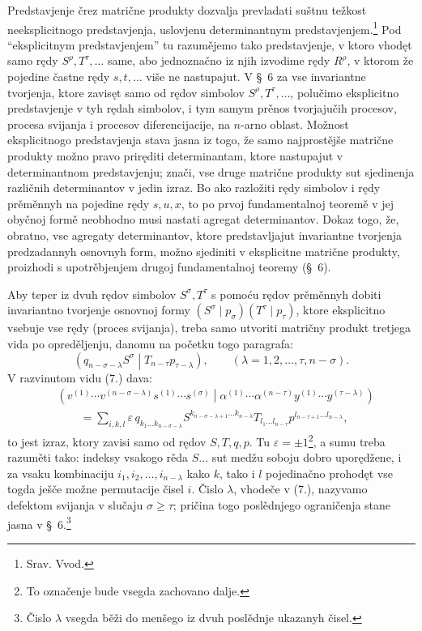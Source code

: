 \documentclass[11pt]{article}
\newcommand{\pair}[2]{\left(#1\middle|#2\right)}
\newcommand{\eps}{\varepsilon}
\begin{document}
Predstavjenje črez matrične produkty dozvalja prevladati suštnu težkost neeksplicitnogo predstavjenja, uslovjenu determinantnym predstavjenjem.\footnote{Srav. Vvod.} Pod ``eksplicitnym predstavjenjem'' tu razumějemo tako predstavjenje, v ktoro vhodęt samo rędy $S^\rho,T^\tau,\ldots$ same, abo jednoznačno iz njih izvodime rędy $R^\rho$, v ktorom že pojedine častne rędy $s,t,\ldots$ više ne nastupajut. V \S\ 6 za vse invariantne tvorjenja, ktore zavisęt samo od rędov simbolov $S^\rho,T^\tau,\ldots$, polučimo eksplicitno predstavjenje v tyh rędah simbolov, i tym samym prěnos tvorjajučih procesov, procesa svijanja i procesov diferencijacije, na $n$-arno oblast. Možnost eksplicitnogo predstavjenja stava jasna iz togo, že samo najprostějše matrične produkty možno pravo priręditi determinantam, ktore nastupajut v determinantnom predstavjenju; znači, vse druge matrične produkty sut sjedinenja različnih determinantov v jedin izraz. Bo ako razložiti rędy simbolov i rędy prěměnnyh na pojedine rędy $s,u,x$, to po prvoj fundamentalnoj teoremě v jej obyčnoj formě neobhodno musi nastati agregat determinantov. Dokaz togo, že, obratno, vse agregaty determinantov, ktore predstavljajut invariantne tvorjenja predzadannyh osnovnyh form, možno sjediniti v eksplicitne matrične produkty, proizhodi s upotrěbjenjem drugoj fundamentalnoj teoremy (\S\ 6).

Aby teper iz dvuh rędov simbolov $S^\sigma,T^\tau$ s pomoću rędov prěměnnyh dobiti invariantno tvorjenje osnovnoj formy $(S^\sigma\mid p_\sigma)(T^\tau\mid p_\tau)$, ktore eksplicitno vsebuje vse rędy (proces svijanja), treba samo utvoriti matričny produkt tretjega vida po opreděljenju, danomu na početku togo paragrafa:
\begin{equation}
 \pair{q_{n-\sigma-\lambda}S^\sigma}{T_{n-\tau}p_{\tau-\lambda}},
 \qquad (\lambda=1,2,\ldots,\tau,n-\sigma).
\tag{7}
\end{equation}
V razvinutom vidu (7.) dava:
\begin{equation}
\begin{aligned}
&\pair{v^{(1)}\cdots v^{(n-\sigma-\lambda)}s^{(1)}\cdots s^{(\sigma)}}
       {\alpha^{(1)}\cdots\alpha^{(n-\tau)}y^{(1)}\cdots y^{(\tau-\lambda)}} \\
&\qquad =\sum_{i,k,l}\eps\,q_{k_1\ldots k_{n-\sigma-\lambda}}
 S^{k_{n-\sigma-\lambda+1}\ldots k_{n-\lambda}}
 T_{l_1\ldots l_{n-\tau}}
 p^{l_{n-\tau+1}\ldots l_{n-\lambda}},
\end{aligned}
\tag{8}
\end{equation}
to jest izraz, ktory zavisi samo od rędov $S,T,q,p$. Tu $\eps=\pm1$\footnote{To označenje bude vsegda zachovano dalje.}, a sumu treba razuměti tako: indeksy vsakogo rěda $S\ldots$ sut medžu soboju dobro uporędžene, i za vsaku kombinaciju $i_1,i_2,\ldots,i_{n-\lambda}$ kako $k$, tako i $l$ pojedinačno prohodęt vse togda ješče možne permutacije čisel $i$. Čislo $\lambda$, vhodeče v (7.), nazyvamo defektom svijanja v slučaju $\sigma\geq\tau$; pričina togo poslědnjego ograničenja stane jasna v \S\ 6.\footnote{Čislo $\lambda$ vsegda běži do menšego iz dvuh poslědnje ukazanyh čisel.}
\end{document}
